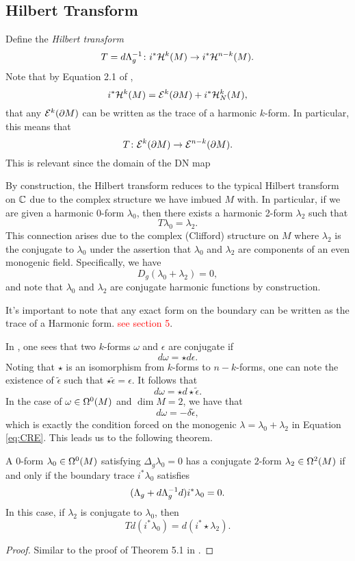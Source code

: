 \documentclass[12pt]{article}
\begin{document}
\subsection{Hilbert Transform}

Define the \emph{Hilbert transform} 
\[
T = d\dnmap^{-1} \colon i^* \harmonic{k}{} \to i^* \harmonic{n-k}{}.
\]
Note that by Equation 2.1 of \cite{shara},
\[
i^* \harmonic{k}{} = \boundaryexact{k} + i^* \harmonic{k}{N},
\]
that any $\boundaryexact{k}$ can be written as the trace of a harmonic $k$-form. In particular, this means that
\[
T \colon \boundaryexact{k} \to \boundaryexact{n-k}.
\]
This is relevant since the domain of the DN map 

By construction, the Hilbert transform reduces to the typical Hilbert transform on $\C$ due to the complex structure we have imbued $M$ with.  In particular, if we are given a harmonic 0-form $\lambda_0$, then there exists a harmonic 2-form $\lambda_2$ such that
\[
T\lambda_0 = \lambda_2.
\]
This connection arises due to the complex (Clifford) structure on $M$ where $\lambda_2$ is the conjugate to $\lambda_0$ under the assertion that $\lambda_0$ and $\lambda_2$ are components of an even monogenic field. Specifically, we have
\[
D_g (\lambda_0 + \lambda_2) = 0,
\]
and note that $\lambda_0$ and $\lambda_2$ are conjugate harmonic functions by construction.


It's important to note that any exact form on the boundary can be written as the trace of a Harmonic form. \textcolor{red}{see \cite{shara} section 5}.

  In \cite{shara}, one sees that two $k$-forms $\omega$ and $\epsilon$ are conjugate if
\[
d\omega = \star d \epsilon.
\]
Noting that $\star$ is an isomorphism from $k$-forms to $n-k$-forms, one can note the existence of $\tilde{\epsilon}$ such that $\star \tilde{\epsilon}=\epsilon$. It follows that
\[
d\omega = \star d \star \tilde{\epsilon}.
\]
In the case of $\omega \in \kforms{0}{}$ and $\dim M=2$, we have that
\[
d\omega = - \delta \tilde{\epsilon},
\]
which is exactly the condition forced on the monogenic $\lambda = \lambda_0 + \lambda_2$ in Equation \ref{eq:CRE}. This leads us to the following theorem.

\begin{theorem}
A 0-form $\lambda_0 \in \kforms{0}{}$ satisfying $\Delta_g \lambda_0=0$ has a conjugate $2$-form $\lambda_2 \in \kforms{2}{}$ if and only if the boundary trace $i^*  \lambda_0$ satisfies
\[
(\dnmap + d \dnmap^{-1} d)i^* \lambda_0 = 0.
\]
In this case, if $\lambda_2$ is conjugate to $\lambda_0$, then
\[
Td(i^* \lambda_0) = d (i^* \star \lambda_2).
\]
\end{theorem}
\begin{proof}
Similar to the proof of Theorem 5.1 in \cite{shara}.
\end{proof}
\end{document}

